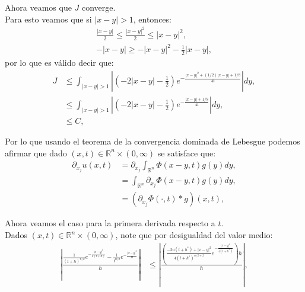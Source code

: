 \documentclass{beamer}
\begin{document}
\begin{frame}
  \begin{block}{}
    Ahora veamos que $J$ converge.\\
    Para esto veamos que si $|x-y|>1$, entonces:
    \begin{align*}
      \frac{|x-y|}{2}\leq\frac{|x-y|^2}{2}\leq |x-y|^2,\\
      -|x-y|\geq-|x-y|^2-\frac{1}{2}|x-y|,
    \end{align*}
    por lo que es válido decir que:
    \begin{align*}
      J&\leq \int_{|x-y|>1} \left| \left(-2|x-y| -\frac{1}{2}\right)e^{-\frac{|x-y|^2+(1/2)|x-y|+1/8}{4t}}\right|dy,\\
      &\leq \int_{|x-y|>1} \left| \left(-2|x-y| -\frac{1}{2}\right)e^{-\frac{|x-y|+1/8}{4t}}\right|dy,\\
      &\leq C,
    \end{align*}
  \end{block}
\end{frame}

\begin{frame}
  \begin{block}{}
    Por lo que usando el teorema de la convergencia dominada de Lebesgue podemos afirmar que dado $(x,t)\in\mathbb{R}^{n}\times (0,\infty)$ se satisface que:
      \begin{align*}
        \partial_{x_j}u(x,t)&=\partial_{x_j}\int_{\mathbb{R}^{n}}\Phi(x-y,t)g(y)dy,\\
        &=\int_{\mathbb{R}^{n}}\partial_{x_j}\Phi(x-y,t)g(y)dy,\\
        &=(\partial_{x_j}\Phi(\cdot,t)*g)(x,t),
      \end{align*}
  \end{block}
\end{frame}

\begin{frame}
  \begin{block}{}
    Ahora veamos el caso para la primera derivada respecto a $t$.\\
    Dados $(x,t)\in\mathbb{R}^{n}\times (0,\infty)$, note que por desigualdad del valor medio:
    \begin{align*}
      \left| \frac{\frac{1}{(t+h)^{n/2}}e^{-\frac{|x-y|^2}{4(t+h)}}-\frac{1}{t^{n/2}}e^{-\frac{|x-y|^2}{4t}}}{h} \right|&\leq \left| \frac{\left( \frac{-2n(t+h^*)+|x-y|^2}{4(t+h^*)^{n/2+2}}e^{-\frac{|x-y|^2}{4(t+h^*)}} \right)h}{h} \right|,
    \end{align*}
  \end{block}
\end{frame}
\end{document}
